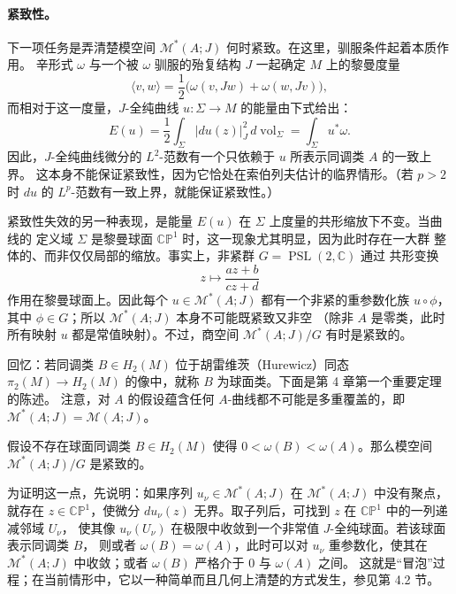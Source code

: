 \paragraph{紧致性。}
下一项任务是弄清楚模空间 $\mathcal M^*(A;J)$ 何时紧致。在这里，驯服条件起着本质作用。
辛形式 $\omega$ 与一个被 $\omega$ 驯服的殆复结构 $J$ 一起确定 $M$ 上的黎曼度量
\[
  \langle v,w\rangle=\frac12\bigl(\omega(v,Jw)+\omega(w,Jv)\bigr),
\]
而相对于这一度量，$J$-全纯曲线 $u:\Sigma\to M$ 的能量由下式给出：
\[
  E(u)=\frac12\int_\Sigma |du(z)|_J^2\,d\operatorname{vol}_\Sigma
      =\int_\Sigma u^*\omega.
\]
因此，$J$-全纯曲线微分的 $L^2$-范数有一个只依赖于 $u$ 所表示同调类 $A$ 的一致上界。
这本身不能保证紧致性，因为它恰处在索伯列夫估计的临界情形。（若 $p>2$ 时 $du$ 的
$L^p$-范数有一致上界，就能保证紧致性。）

紧致性失效的另一种表现，是能量 $E(u)$ 在 $\Sigma$ 上度量的共形缩放下不变。当曲线的
定义域 $\Sigma$ 是黎曼球面 $\mathbb{CP}^1$ 时，这一现象尤其明显，因为此时存在一大群
整体的、而非仅仅局部的缩放。事实上，非紧群 $G=\operatorname{PSL}(2,\mathbb C)$ 通过
共形变换
\[
  z\longmapsto\frac{az+b}{cz+d}
\]
作用在黎曼球面上。因此每个 $u\in\mathcal M^*(A;J)$ 都有一个非紧的重参数化族
$u\circ\phi$，其中 $\phi\in G$；所以 $\mathcal M^*(A;J)$ 本身不可能既紧致又非空
（除非 $A$ 是零类，此时所有映射 $u$ 都是常值映射）。不过，商空间
$\mathcal M^*(A;J)/G$ 有时是紧致的。

回忆：若同调类 $B\in H_2(M)$ 位于胡雷维茨（Hurewicz）同态
$\pi_2(M)\to H_2(M)$ 的像中，就称 $B$ 为球面类。下面是第 4 章第一个重要定理的陈述。
注意，对 $A$ 的假设蕴含任何 $A$-曲线都不可能是多重覆盖的，即
$\mathcal M^*(A;J)=\mathcal M(A;J)$。

\begin{namedtheorem}[B]
假设不存在球面同调类 $B\in H_2(M)$ 使得
$0<\omega(B)<\omega(A)$。那么模空间 $\mathcal M^*(A;J)/G$ 是紧致的。
\end{namedtheorem}

为证明这一点，先说明：如果序列 $u_\nu\in\mathcal M^*(A;J)$ 在
$\mathcal M^*(A;J)$ 中没有聚点，就存在 $z\in\mathbb{CP}^1$，使微分
$du_\nu(z)$ 无界。取子列后，可找到 $z$ 在 $\mathbb{CP}^1$ 中的一列递减邻域 $U_\nu$，
使其像 $u_\nu(U_\nu)$ 在极限中收敛到一个非常值 $J$-全纯球面。若该球面表示同调类 $B$，
则或者 $\omega(B)=\omega(A)$，此时可以对 $u_\nu$ 重参数化，使其在
$\mathcal M^*(A;J)$ 中收敛；或者 $\omega(B)$ 严格介于 $0$ 与 $\omega(A)$ 之间。
这就是“冒泡”过程；在当前情形中，它以一种简单而且几何上清楚的方式发生，参见第 4.2 节。

